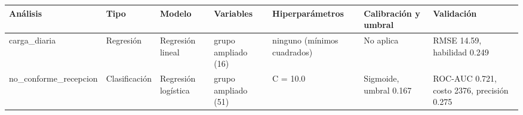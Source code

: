 \begin{tabular}{lllllll}
\toprule
Análisis & Tipo & Modelo & Variables & Hiperparámetros & Calibración y umbral & Validación \\
\midrule
carga\_diaria & Regresión & Regresión lineal & grupo ampliado (16) & ninguno (mínimos cuadrados) & No aplica & RMSE 14.59, habilidad 0.249 \\
no\_conforme\_recepcion & Clasificación & Regresión logística & grupo ampliado (51) & C = 10.0 & Sigmoide, umbral 0.167 & ROC-AUC 0.721, costo 2376, precisión 0.275 \\
\bottomrule
\end{tabular}

